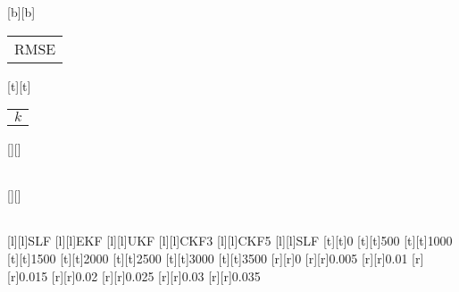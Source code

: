 %
%
[b][b]{\color[rgb]{0,0,0}\setlength{\tabcolsep}{0pt}\begin{tabular}{c}RMSE\end{tabular}}%
[t][t]{\color[rgb]{0,0,0}\setlength{\tabcolsep}{0pt}\begin{tabular}{c}$k$\end{tabular}}%
[][]{\color[rgb]{0,0,0}\setlength{\tabcolsep}{0pt}\begin{tabular}{c} \end{tabular}}%
[][]{\color[rgb]{0,0,0}\setlength{\tabcolsep}{0pt}\begin{tabular}{c} \end{tabular}}%
[l][l]{\color[rgb]{0,0,0}SLF}%
[l][l]{\color[rgb]{0,0,0}EKF}%
[l][l]{\color[rgb]{0,0,0}UKF}%
[l][l]{\color[rgb]{0,0,0}CKF3}%
[l][l]{\color[rgb]{0,0,0}CKF5}%
[l][l]{\color[rgb]{0,0,0}SLF}%
%
[t][t]{0}%
[t][t]{500}%
[t][t]{1000}%
[t][t]{1500}%
[t][t]{2000}%
[t][t]{2500}%
[t][t]{3000}%
[t][t]{3500}%
%
[r][r]{0}%
[r][r]{0.005}%
[r][r]{0.01}%
[r][r]{0.015}%
[r][r]{0.02}%
[r][r]{0.025}%
[r][r]{0.03}%
[r][r]{0.035}%
%
%
